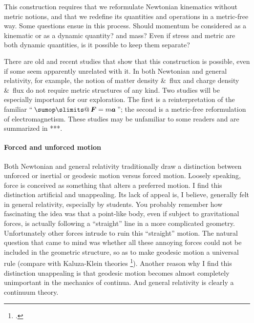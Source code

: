 \documentclass[\ifafour a4paper,12pt,\else a5paper,10pt,\fi%
onecolumn,oneside,article,%
british%
]{memoir}
\makeatletter
\theoremstyle{remark}
\theoremstyle{innote}
\def\sum{\DOTSI\sumop\slimits@}
\newcommand*{\citep}{\footcites}
\newcommand*{\amp}{\&}
\renewcommand*{\|}[1][]{\nonscript\,#1\vert\nonscript\;\mathopen{}}
\newcommand*{\tsum}{\mathop{\textstyle\sum}\nolimits}
\newcommand*{\puzzle}{{\fontencoding{U}\fontfamily{fontawesometwo}\selectfont\symbol{225}}}
\newcommand*{\psects}{\puzzle}%
\makeatother
\begin{document}
This construction requires that we reformulate Newtonian kinematics without
metric notions, and that we redefine its quantities and operations in a
metric-free way. Some questions ensue in this process. Should momentum be
considered as a kinematic or as a dynamic quantity? and mass? Even if
stress and metric are both dynamic quantities, is it possible to keep them
separate?

There are old and recent studies that show that this construction is
possible, even if some seem apparently unrelated with it. In both Newtonian
and general relativity, for example, the notion of matter density \amp\
flux and charge density \amp\ flux do not require metric structures of any
kind. %
Two studies will be especially important for our exploration. The first is
a reinterpretation of the familiar \enquote{\,$\tsum\bm{F} = m\bm{a}$\,};
the second is a metric-free reformulation of electromagnetism. These
studies may be unfamiliar to some readers and are summarized in \psects***.


\paragraph{Forced and unforced motion}

Both Newtonian and general relativity traditionally draw a distinction
between unforced or inertial or geodesic motion versus forced motion.
Loosely speaking, force is conceived as something that alters a preferred
motion. I find this distinction artificial and unappealing. Its lack of
appeal is, I believe, generally felt in general relativity, especially by
students. You probably remember how fascinating the idea was that a
point-like body, even if subject to gravitational forces, is actually
following a \enquote{straight} line in a more complicated geometry.
Unfortunately other forces intrude to ruin this \enquote{straight} motion.
The natural question that came to mind was whether all these annoying
forces could not be included in the geometric structure, so as to make
geodesic motion a universal rule (compare with Kaluza-Klein theories
\citep{kaluza1921,goenner2004,goenner2012,verbinetal2005}). Another reason
why I find this distinction unappealing is that geodesic motion becomes
almost completely unimportant in the mechanics of continua. And general
relativity is clearly a continuum theory.
\end{document}
